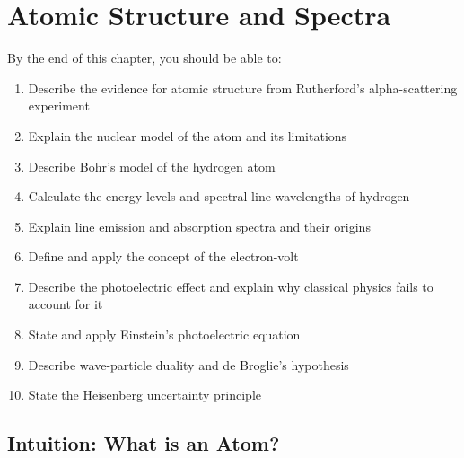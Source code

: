 %

\chapter{Atomic Structure and Spectra}
\label{ch:atomic_structure}
\minitoc
\newpage


\begin{objectivebox}
By the end of this chapter, you should be able to:
\begin{enumerate}[noitemsep]
  \item Describe the evidence for atomic structure from
  Rutherford's alpha-scattering experiment
  \item Explain the nuclear model of the atom and
  its limitations
  \item Describe Bohr's model of the hydrogen atom
  \item Calculate the energy levels and spectral
  line wavelengths of hydrogen
  \item Explain line emission and absorption spectra
  and their origins
  \item Define and apply the concept of the
  electron-volt
  \item Describe the photoelectric effect and
  explain why classical physics fails to account
  for it
  \item State and apply Einstein's photoelectric
  equation
  \item Describe wave-particle duality and de
  Broglie's hypothesis
  \item State the Heisenberg uncertainty principle
\end{enumerate}
\end{objectivebox}

\section{Intuition: What is an Atom?}

